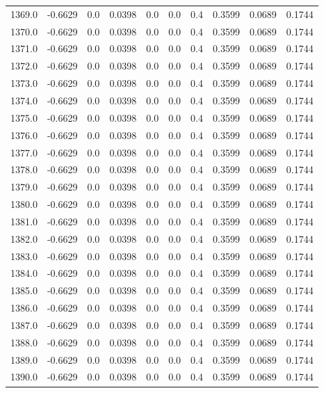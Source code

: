 \begin{longtable}{lrrrrrrrrr}
1369.0 & -0.6629 & 0.0 & 0.0398 & 0.0 & 0.0 & 0.4 & 0.3599 & 0.0689 & 0.1744 \\
1370.0 & -0.6629 & 0.0 & 0.0398 & 0.0 & 0.0 & 0.4 & 0.3599 & 0.0689 & 0.1744 \\
1371.0 & -0.6629 & 0.0 & 0.0398 & 0.0 & 0.0 & 0.4 & 0.3599 & 0.0689 & 0.1744 \\
1372.0 & -0.6629 & 0.0 & 0.0398 & 0.0 & 0.0 & 0.4 & 0.3599 & 0.0689 & 0.1744 \\
1373.0 & -0.6629 & 0.0 & 0.0398 & 0.0 & 0.0 & 0.4 & 0.3599 & 0.0689 & 0.1744 \\
1374.0 & -0.6629 & 0.0 & 0.0398 & 0.0 & 0.0 & 0.4 & 0.3599 & 0.0689 & 0.1744 \\
1375.0 & -0.6629 & 0.0 & 0.0398 & 0.0 & 0.0 & 0.4 & 0.3599 & 0.0689 & 0.1744 \\
1376.0 & -0.6629 & 0.0 & 0.0398 & 0.0 & 0.0 & 0.4 & 0.3599 & 0.0689 & 0.1744 \\
1377.0 & -0.6629 & 0.0 & 0.0398 & 0.0 & 0.0 & 0.4 & 0.3599 & 0.0689 & 0.1744 \\
1378.0 & -0.6629 & 0.0 & 0.0398 & 0.0 & 0.0 & 0.4 & 0.3599 & 0.0689 & 0.1744 \\
1379.0 & -0.6629 & 0.0 & 0.0398 & 0.0 & 0.0 & 0.4 & 0.3599 & 0.0689 & 0.1744 \\
1380.0 & -0.6629 & 0.0 & 0.0398 & 0.0 & 0.0 & 0.4 & 0.3599 & 0.0689 & 0.1744 \\
1381.0 & -0.6629 & 0.0 & 0.0398 & 0.0 & 0.0 & 0.4 & 0.3599 & 0.0689 & 0.1744 \\
1382.0 & -0.6629 & 0.0 & 0.0398 & 0.0 & 0.0 & 0.4 & 0.3599 & 0.0689 & 0.1744 \\
1383.0 & -0.6629 & 0.0 & 0.0398 & 0.0 & 0.0 & 0.4 & 0.3599 & 0.0689 & 0.1744 \\
1384.0 & -0.6629 & 0.0 & 0.0398 & 0.0 & 0.0 & 0.4 & 0.3599 & 0.0689 & 0.1744 \\
1385.0 & -0.6629 & 0.0 & 0.0398 & 0.0 & 0.0 & 0.4 & 0.3599 & 0.0689 & 0.1744 \\
1386.0 & -0.6629 & 0.0 & 0.0398 & 0.0 & 0.0 & 0.4 & 0.3599 & 0.0689 & 0.1744 \\
1387.0 & -0.6629 & 0.0 & 0.0398 & 0.0 & 0.0 & 0.4 & 0.3599 & 0.0689 & 0.1744 \\
1388.0 & -0.6629 & 0.0 & 0.0398 & 0.0 & 0.0 & 0.4 & 0.3599 & 0.0689 & 0.1744 \\
1389.0 & -0.6629 & 0.0 & 0.0398 & 0.0 & 0.0 & 0.4 & 0.3599 & 0.0689 & 0.1744 \\
1390.0 & -0.6629 & 0.0 & 0.0398 & 0.0 & 0.0 & 0.4 & 0.3599 & 0.0689 & 0.1744 \\

\end{longtable}
